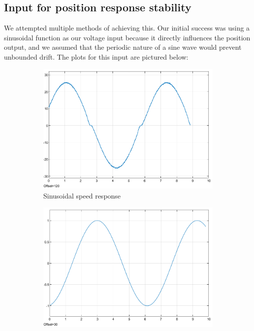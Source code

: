 \documentclass{article}
\begin{document}
\subsection{Input for position response stability}
We attempted multiple methods of achieving this. Our initial success was using a sinusoidal function as our voltage input because it directly influences the position output, and we assumed that the periodic nature of a sine wave would prevent unbounded drift. The plots for this input are pictured below:
\begin{figure}[H]
    \centering
    \begin{subfigure}[b]{0.45\linewidth}
        \centering
        \includegraphics[width=\linewidth]{sinespeed.png}
        \caption{Sinusoidal speed response}
        \label{fig:sinespeed}
    \end{subfigure}
    \hfill
    \begin{subfigure}[b]{0.45\linewidth}
        \centering
        \includegraphics[width=\linewidth]{sinevoltage.png}

\end{subfigure}
\end{figure}
\end{document}
